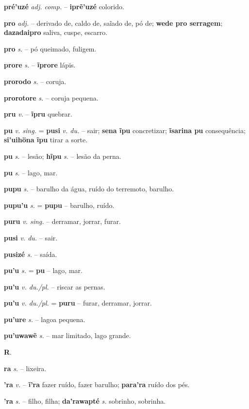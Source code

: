 \textbf{pré'uzé} \textit{adj. comp.} -- \textbf{iprẽ'uzé} colorido.

\textbf{pro} \textit{adj.} -- derivado de, caldo de, saĩado de, pó de; \textbf{wede pro serragem}; \textbf{dazadaipro} saliva, cuspe, escarro.

\textbf{pro} \textit{s.} -- pó queimado, fuligem.

\textbf{prore} \textit{s.} -- \textbf{ĩprore} lápis.

\textbf{prorodo} \textit{s.} -- coruja.

\textbf{prorotore} \textit{s.} -- coruja pequena.

\textbf{pru} \textit{v.} -- \textbf{ĩpru} quebrar.

\textbf{pu} \textit{v. sing.} = \textbf{pusi} \textit{v. du.} -- sair; \textbf{sena ĩpu} concretizar; \textbf{ĩsarina pu} consequência; \textbf{si'uihöna ĩpu} tirar a sorte.

\textbf{pu} \textit{s.} -- lesão; \textbf{hĩpu} \textit{s.} -- lesão da perna.

\textbf{pu} \textit{s.} -- lago, mar.

\textbf{pupu} \textit{s.} -- barulho da água, ruído do terremoto, barulho.

\textbf{pupu'u} \textit{s.} = \textbf{pupu} -- barulho, ruído.

\textbf{puru} \textit{v. sing.} -- derramar, jorrar, furar.

\textbf{pusi} \textit{v. du.} -- sair.

\textbf{pusizé} \textit{s.} -- saída.

\textbf{pu'u} \textit{s.} = \textbf{pu} -- lago, mar.

\textbf{pu'u} \textit{v. du./pl.} -- riscar as pernas.

\textbf{pu'u} \textit{v. du./pl.} = \textbf{puru} -- furar, derramar, jorrar.

\textbf{pu'ure} \textit{s.} -- lagoa pequena.

\textbf{pu'uwawẽ} \textit{s.} -- mar limitado, lago grande.



\textbf{R}.



\textbf{ra} \textit{s.} -- lixeira.

\textbf{'ra} \textit{v.} -- \textbf{ĩ'ra} fazer ruído, fazer barulho; \textbf{para'ra} ruído dos pés.

\textbf{'ra} \textit{s.} -- filho, filha; \textbf{da'rawapté} \textit{s.} sobrinho, sobrinha.

